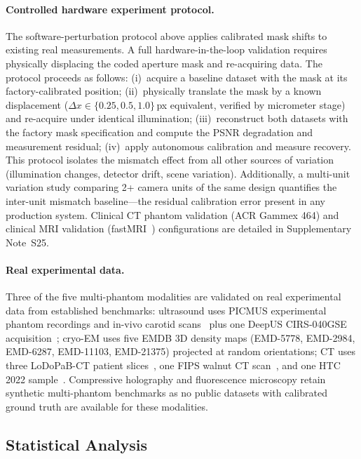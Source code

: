 \paragraph{Controlled hardware experiment protocol.}
The software-perturbation protocol above applies calibrated mask shifts to
existing real measurements.  A full hardware-in-the-loop validation
requires physically displacing the coded aperture mask and re-acquiring
data.  The protocol proceeds as follows: (i)~acquire a baseline dataset
with the mask at its factory-calibrated position; (ii)~physically translate
the mask by a known displacement ($\Delta x \in \{0.25, 0.5, 1.0\}$\,px
equivalent, verified by micrometer stage) and re-acquire under identical
illumination; (iii)~reconstruct both datasets with the factory mask
specification and compute the PSNR degradation and measurement residual;
(iv)~apply \pwm{} autonomous calibration and measure recovery.  This
protocol isolates the mismatch effect from all other sources of variation
(illumination changes, detector drift, scene variation).  Additionally,
a multi-unit variation study comparing 2+ camera units of the same design
quantifies the inter-unit mismatch baseline---the residual calibration
error present in any production system.  Clinical CT phantom validation
(ACR Gammex 464) and clinical MRI validation (fastMRI~\cite{zbontar2018fastmri})
configurations are detailed in Supplementary Note~S25.

\paragraph{Real experimental data.}
Three of the five multi-phantom modalities are validated on real
experimental data from established benchmarks: ultrasound uses PICMUS
experimental phantom recordings and in-vivo carotid
scans~\cite{liebgott2016picmus} plus one DeepUS CIRS-040GSE
acquisition~\cite{khan2020deepus}; cryo-EM uses five EMDB 3D density maps
(EMD-5778, EMD-2984, EMD-6287, EMD-11103, EMD-21375) projected at random
orientations; CT uses three LoDoPaB-CT patient
slices~\cite{leuschner2021lodopab}, one FIPS walnut \textmu CT
scan~\cite{hamalainen2015fips}, and one HTC\,2022
sample~\cite{meaney2022htc}.  Compressive holography and fluorescence
microscopy retain synthetic multi-phantom benchmarks as no public datasets
with calibrated ground truth are available for these modalities.

\subsection*{Statistical Analysis}
\label{sec:methods:statistics}

